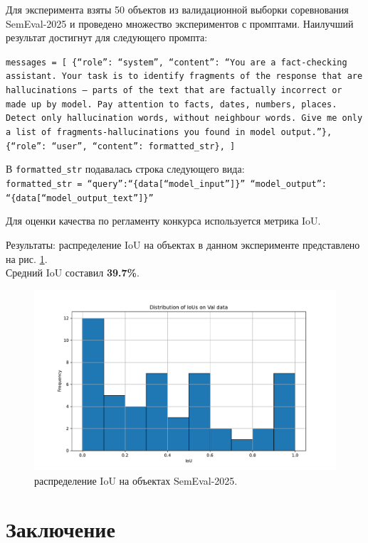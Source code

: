 \documentclass[12pt]{article}
\begin{document}
Для эксперимента взяты 50 объектов из валидационной выборки соревнования SemEval-2025 и проведено множество экспериментов с промптами. Наилучший результат достигнут для следующего промпта:

\texttt{messages = [
    \{``role'': ``system'', ``content'': ``You are a fact-checking assistant. Your task is to identify fragments of the response that are hallucinations -- parts of the text that are factually incorrect or made up by model. Pay attention to facts, dates, numbers, places. Detect only hallucination words, without neighbour words. Give me only a list of fragments-hallucinations you found in model output.''\},
    \{``role'': ``user'', ``content'': formatted\_str\},
]}

В \texttt{formatted\_str} подавалась строка следующего вида:\\
\texttt{formatted\_str = ``query'':``\{data[``model\_input'']\}'' ``model\_output'':\\``\{data[``model\_output\_text'']\}''}

Для оценки качества по регламенту конкурса используется метрика IoU. 

Результаты: распределение IoU на объектах в данном эксперименте представлено на рис. \ref{fig:ious_histogram}.\\ Средний IoU составил \textbf{39.7\%}.

\begin{figure}[h]
    \centering
    \includegraphics[width=\textwidth]{images/ious_histogram.pdf}
    \caption{распределение IoU на объектах SemEval-2025.}
    \label{fig:ious_histogram}
\end{figure}

\clearpage
\section{Заключение}
\end{document}
